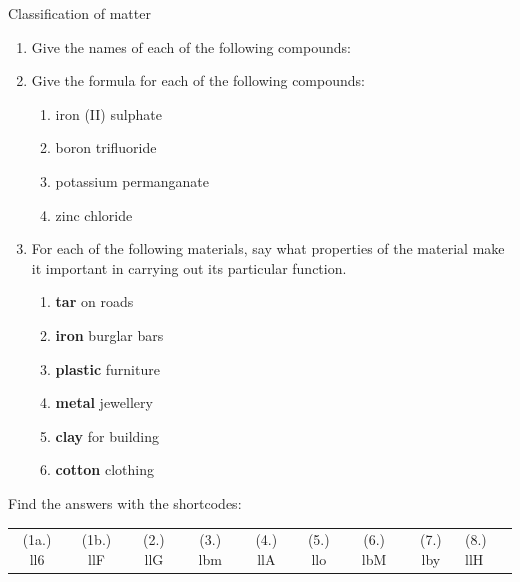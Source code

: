 \begin{eocexercises}{Classification of matter }
{\begin{enumerate}[noitemsep, label=\textbf{\arabic*}. ]
\begin{enumerate}[noitemsep, label=\textbf{\alph*}. ]
\end{enumerate}
\label{m38706*uid153}\item Give the names of each of the following compounds:
\label{m38706*id68358}\begin{enumerate}[noitemsep, label=\textbf{\alph*}. ] 
            \label{m38706*uid154}\item $\text{NaBr}$
\label{m38706*uid155}\item ${\text{Ba}(\text{NO}}}_{2})_2$
\label{m38706*uid156}\item ${\text{SO}}_{2}$ 
\item $\text{H}_{2}\text{SO}_{4}$
\end{enumerate}
\item Give the formula for each of the following compounds:
\begin{enumerate}[noitemsep, label=\textbf{\alph*}.]
 \item iron (II) sulphate
\item boron trifluoride
\item potassium permanganate
\item zinc chloride
\end{enumerate}

\label{m38706*uid157}\item For each of the following materials, say what properties of the material make it important in carrying out its particular function.
\label{m38706*id68436}\begin{enumerate}[noitemsep, label=\textbf{\alph*}. ] 
            \label{m38706*uid158}\item \textbf{tar} on roads
\label{m38706*uid159}\item \textbf{iron} burglar bars
\label{m38706*uid160}\item \textbf{plastic} furniture
\label{m38706*uid161}\item \textbf{metal} jewellery
\label{m38706*uid162}\item \textbf{clay} for building
\label{m38706*uid163}\item \textbf{cotton} clothing
\end{enumerate}
\end{enumerate}
  \label{m38706**end}
  \label{09a7a4809656be0b739ee130746cd803**end}
\par {} Find the answers with the shortcodes:
 \par \begin{tabular}[h]{cccccccc}
 (1a.) ll6 & (1b.) llF &  (2.) llG  &  (3.) lbm  &  (4.) llA  &  (5.) llo  &  (6.) lbM  &  (7.) lby  &  (8.) llH  & \end{tabular}}
\end{eocexercises}
